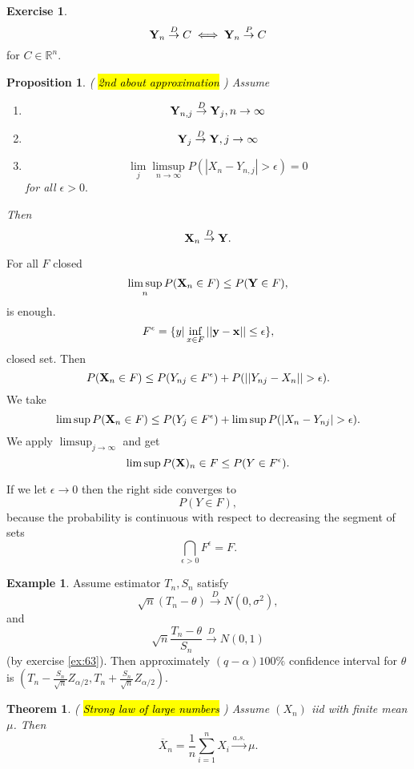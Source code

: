\documentclass[12pt,a4paper, notitlepage]{book}
\newcommand{\hlc}[2][yellow]{ {\sethlcolor{#1} \hl{#2}} }
\theoremstyle{definition} %
\newtheorem{example}{Example}[chapter]
\newtheorem{exercise}{Exercise}[chapter]
\theoremstyle{plain} %
\newtheorem{theorem}{Theorem}
\newtheorem{proposition}[justCounting]{Proposition}
\newcommand{\R}{\mathbb R}
\newcommand{\Important}[1]{ {\it \hlc{#1} } }
\begin{document}
\begin{exercise}
\[ {\bf Y}_n \overset{D}{ \rightarrow} C \iff {\bf Y}_n \overset{P}{ \rightarrow} C\]
 for $C \in \R^n$.
\end{exercise}

\begin{proposition} (\Important{2nd about approximation})
Assume 
\begin{enumerate}
\item \[ {\bf Y}_{n,j} \overset{D}{\rightarrow} {\bf Y}_j, n \rightarrow \infty \]
\item \[ {\bf Y}_j  \overset{D}{\rightarrow} {\bf Y}, j \rightarrow \infty \]
\item \[ \lim_j \limsup_{n\rightarrow \infty}{P(|X_n - Y_{n,j}| > \epsilon)} = 0 \] for all $\epsilon > 0.$
\end{enumerate}
Then 
\[ {\bf X}_n \overset{D}{\rightarrow} {\bf Y}. \]
\end{proposition}
\proof
For all $F $ closed 
\[ \limsup_n{P({\bf X}_n \in F)} \leq P({\bf Y} \in F) , \]
 is enough. 
\[ F^\epsilon = \{y | \inf_{x\in F}||{\bf y} - {\bf x}|| \leq \epsilon \} , \]
 closed set. Then 
\[ P({\bf X}_n \in F) \leq P(Y_{n j} \in F^\epsilon) + P(||Y_{n j} - X_n|| > \epsilon). \]
 We take 
\[ \limsup{P({\bf X}_n \in F)} \leq P(Y_j \in F^\epsilon) + \limsup{P(|X_n - Y_{n j}| > \epsilon)}. \]
 We apply $\limsup_{j\to \infty}$ and get 
\[ \limsup{P({\bf X})_n \in F} \leq P(Y \in F^\epsilon). \]

If we let $\epsilon \rightarrow 0$ then the right side converges to 
\[ P(Y \in F) , \] because the probability is continuous with respect to decreasing the segment of sets 
\[ \bigcap_{\epsilon > 0} F^\epsilon = F. \]
\endproof

\begin{example}
Assume estimator $T_n, S_n$ satisfy 
\[ \sqrt{n}(T_n - \theta) \overset{D}{\rightarrow} N(0, \sigma^2) , \]
 and 
\[ \sqrt{n}\frac{T_n - \theta}{S_n} \overset{D}{\rightarrow} N(0,1) \] (by exercise \ref{ex:63}).
Then approximately $(q - \alpha) 100 \%$ confidence interval for $\theta$ is $(T_n - \frac{S_n}{\sqrt{n}}Z_{\alpha/2},T_n + \frac{S_n}{\sqrt{n}}Z_{\alpha/2})$.
\end{example}

\begin{theorem} (\Important{Strong law of large numbers} )
Assume $(X_n)$ iid with finite mean $\mu$. Then 
\[ \overline{X}_n = \frac{1}{n} \sum _{i=1}^n X_i \overset{a.s.}{ \rightarrow}\mu . \]
\end{theorem}
\end{document}
